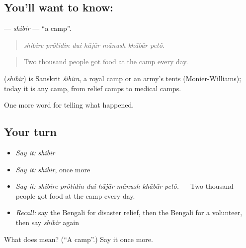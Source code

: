 \subsection*{You'll want to know: }
\textbf{} — \emph{shibir} — \textquotedblleft{}a camp\textquotedblright{}.

\begin{quote}
      
\end{quote}

\begin{quote}
\emph{shibire prôtidin dui hājār mānush khābār petô.}
\end{quote}

\begin{quote}
Two thousand people got food at the camp every day.
\end{quote}

\begin{cousinweb}
\textbf{} (\emph{shibir}) is Sanskrit \emph{śibira}, a royal camp or an army's tents (Monier-Williams); today it is any camp, from relief camps to medical camps.
\end{cousinweb}

\begin{grammarlens}[title={What you've built}]
One more word for telling what happened.
\end{grammarlens}

\subsection*{Your turn}
\begin{itemize}
\raggedright
  \item \emph{Say it:} \emph{shibir}
  \item \emph{Say it:} \emph{shibir}, once more
  \item \emph{Say it:} \emph{shibire prôtidin dui hājār mānush khābār petô.} — Two thousand people got food at the camp every day.
  \item \emph{Recall:} say the Bengali for disaster relief, then the Bengali for a volunteer, then say \emph{shibir} again
\end{itemize}

\begin{tcolorbox}[breakable,colback=teal!4,colframe=teal!35!black,title={Before you move on}]
What does  mean? (\textquotedblleft{}A camp\textquotedblright{}.) Say it once more.
\end{tcolorbox}
